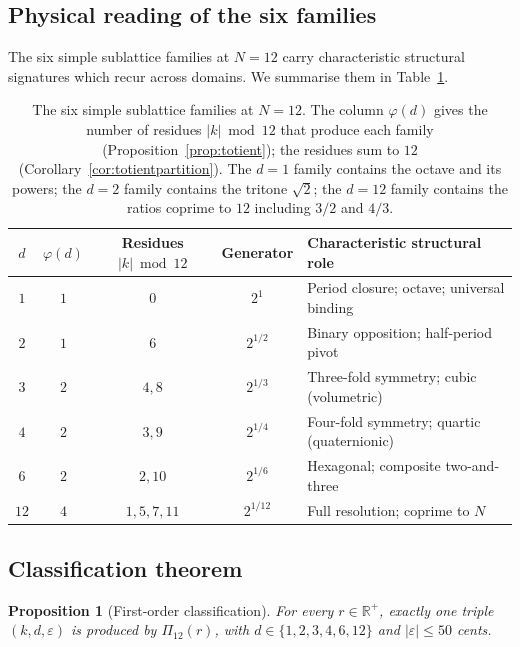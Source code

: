 \documentclass[11pt,a4paper]{article}
\newtheorem{proposition}[theorem]{Proposition}
\theoremstyle{definition}
\theoremstyle{remark}
\newcommand{\R}{\mathbb{R}}
\newcommand{\eps}{\varepsilon}
\begin{document}
\subsection{Physical reading of the six families}

The six simple sublattice families at $N=12$ carry characteristic structural signatures which recur across domains. We summarise them in Table~\ref{tab:families}.

\begin{table}[h]
\centering
\begin{tabular}{@{}c c c c l@{}}
\toprule
$d$ & $\varphi(d)$ & Residues $|k|\bmod 12$ & Generator & Characteristic structural role\\
\midrule
$1$ & $1$ & $0$ & $2^{1}$ & Period closure; octave; universal binding\\
$2$ & $1$ & $6$ & $2^{1/2}$ & Binary opposition; half-period pivot\\
$3$ & $2$ & $4,8$ & $2^{1/3}$ & Three-fold symmetry; cubic (volumetric)\\
$4$ & $2$ & $3,9$ & $2^{1/4}$ & Four-fold symmetry; quartic (quaternionic)\\
$6$ & $2$ & $2,10$ & $2^{1/6}$ & Hexagonal; composite two-and-three\\
$12$ & $4$ & $1,5,7,11$ & $2^{1/12}$ & Full resolution; coprime to $N$\\
\bottomrule
\end{tabular}
\caption{The six simple sublattice families at $N=12$. The column $\varphi(d)$ gives the number of residues $|k|\bmod 12$ that produce each family (Proposition~\ref{prop:totient}); the residues sum to $12$ (Corollary~\ref{cor:totientpartition}). The $d=1$ family contains the octave and its powers; the $d=2$ family contains the tritone $\sqrt{2}$; the $d=12$ family contains the ratios coprime to $12$ including $3/2$ and $4/3$.}
\label{tab:families}
\end{table}

\subsection{Classification theorem}

\begin{proposition}[First-order classification]\label{prop:classification}
For every $r\in\R^{+}$, exactly one triple $(k,d,\eps)$ is produced by $\Pi_{12}(r)$, with $d\in\{1,2,3,4,6,12\}$ and $|\eps|\le 50$ cents.
\end{proposition}
\end{document}
